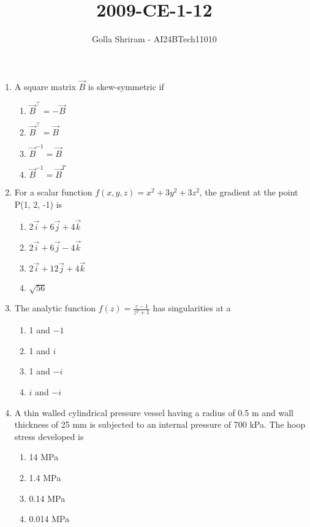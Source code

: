 \documentclass[journal,12pt,twocolumn]{IEEEtran}
\theoremstyle{remark}
\begin{document}

\onecolumn
\vspace{3cm}
\title{ 2009-CE-1-12 }
\author{Golla Shriram - AI24BTech11010}

\maketitle

\renewcommand{\thefigure}{\theenumi}
\renewcommand{\thetable}{\theenumi}


                                                                           
 \begin{enumerate}
		 
	 \item A square matrix $\vec{B}$ is skew-symmetric if
 \begin{enumerate}
  \item $\vec{B}^{\top} = - \vec{B}$
  \item $\vec{B}^{\top} = \vec{B}$
  \item $\vec{B}^{-1} =  \vec{B}$
  \item $\vec{B}^{-1} =  \vec{B}^{T}$
 \end{enumerate}

\item For a scalar function $f(x,y,z) = x^2+3y^2+3z^2$, the gradient at the point P(1, 2, -1) is
\begin{enumerate}
	\item $2\overrightarrow{i}+6\overrightarrow{j}+4\overrightarrow{k} $
	\item $2\overrightarrow{i}+6\overrightarrow{j}-4\overrightarrow{k} $
	\item $2\overrightarrow{i}+12\overrightarrow{j}+4\overrightarrow{k} $
	\item $\sqrt{56}$
\end{enumerate}

\item The analytic function $f(z) = \frac{z-1}{z^{2}+1}$ has singularities at a
	\begin{enumerate}
	\item 1 and $-1$
	\item 1 and $i$
	\item 1 and $-i$
	\item $i$ and $-i$
	\end{enumerate}


\item A thin walled cylindrical pressure vessel having a radius of 0.5 m and wall thickness of 25 mm is subjected to an internal pressure of 700 kPa. The hoop stress developed is 
	\begin{enumerate}
		\item 14 MPa
		\item 1.4 MPa
		\item 0.14 MPa
		\item 0.014 MPa
	\end{enumerate}		


\end{enumerate}
\end{document}
